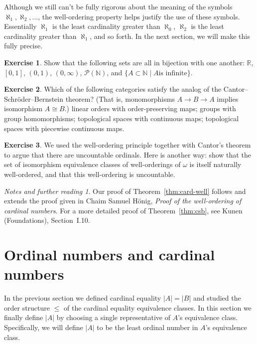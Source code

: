 \documentclass[11pt,oneside,a4paper]{amsbook}
\newcommand{\N}{\mathbb N}
\newcommand{\R}{\mathbb R}
\theoremstyle{definition}
\newtheorem{exercise}{Exercise}[section]
\theoremstyle{plain}
\theoremstyle{definition}
\theoremstyle{remark}
\newtheorem*{notes}{Notes and further reading}
\numberwithin{equation}{section}
\numberwithin{figure}{section}
\begin{document}
Although we still can't be fully rigorous about the meaning of the symbols $\aleph_1,\aleph_2,\ldots$, the well-ordering property helps justify the use of these symbols. Essentially $\aleph_1$ is the least cardinality greater than $\aleph_0$, $\aleph_2$ is the least cardinality greater than $\aleph_1$, and so forth. In the next section, we will make this fully precise.

\begin{exercise}
  Show that the following sets are all in bijection with one another: $\R$, $[0,1]$, $(0,1)$, $(0,\infty)$, $\mathcal P(\N)$, and $\{A\subset\N\mid A\text{is infinite}\}$.
\end{exercise}

\begin{exercise}
  Which of the following categories satisfy the analog of the Cantor--Schr\"oder--Bernstein theorem? (That is, monomorphisms $A\to B\to A$ implies isomorphism $A\cong B$.) linear orders with order-preserving maps; groups with group homomorphisms; topological spaces with continuous maps; topological spaces with piecewise continuous maps.
\end{exercise}

\begin{exercise}
  We used the well-ordering principle together with Cantor's theorem to argue that there are uncountable ordinals. Here is another way: show that the set of isomorphism equivalence classes of well-orderings of $\omega$ is itself naturally well-ordered, and that this well-ordering is uncountable.
\end{exercise}

\begin{notes}
  Our proof of Theorem~\ref{thm:card-well} follows and extends the proof given in Chaim Samuel H\"onig, \emph{Proof of the well-ordering of cardinal numbers}. For a more detailed proof of Theorem~\ref{thm:csb}, see Kunen (Foundations), Section~I.10.
\end{notes}


\newpage
\section{Ordinal numbers and cardinal numbers}

In the previous section we defined cardinal equality $|A|=|B|$ and studied the order structure $\leq$ of the cardinal equality equivalence classes. In this section we finally define $|A|$ by choosing a single representative of $A$'s equivalence class. Specifically, we will define $|A|$ to be the least ordinal number in $A$'s equivalence class.
\end{document}
